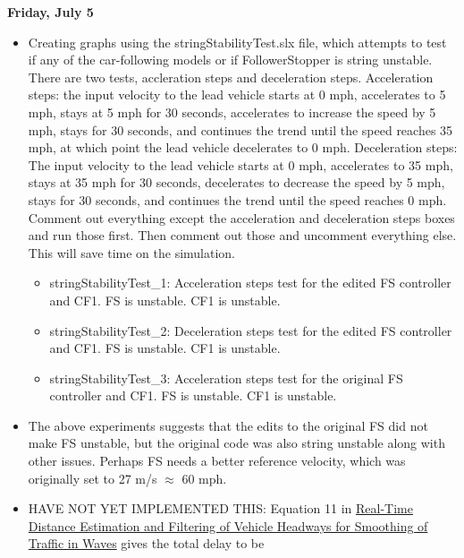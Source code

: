 \documentclass[12pt, letterpaper]{article}
\begin{document}
{\bf Friday, July 5} \\
\begin{itemize}
\item Creating graphs using the stringStabilityTest.slx file, which attempts to test if any of the car-following models or if FollowerStopper is string unstable. There are two tests, accleration steps and deceleration steps. Acceleration steps: the input velocity to the lead vehicle starts at 0 mph, accelerates to 5 mph, stays at 5 mph for 30 seconds, accelerates to increase the speed by 5 mph, stays for 30 seconds, and continues the trend until the speed reaches 35 mph, at which point the lead vehicle decelerates to 0 mph. Deceleration steps: The input velocity to the lead vehicle starts at 0 mph, accelerates to 35 mph, stays at 35 mph for 30 seconds, decelerates to decrease the speed by 5 mph, stays for 30 seconds, and continues the trend until the speed reaches 0 mph. Comment out everything except the acceleration and deceleration steps boxes and run those first. Then comment out those and uncomment everything else. This will save time on the simulation.
	\begin{itemize}
	\item stringStabilityTest\_1: Acceleration steps test for the edited FS controller and CF1. \linebreak
	FS is unstable. CF1 is unstable.
	\item stringStabilityTest\_2: Deceleration steps test for the edited FS controller and CF1. \linebreak
	FS is unstable. CF1 is unstable.
	\item stringStabilityTest\_3: Acceleration steps test for the original FS controller and CF1. \linebreak
	FS is unstable. CF1 is unstable.
	\end{itemize}
\item The above experiments suggests that the edits to the original FS did not make FS unstable, but the original code was also string unstable along with other issues. Perhaps FS needs a better reference velocity, which was originally set to 27 m/s $\approx$ 60 mph.
\item HAVE NOT YET IMPLEMENTED THIS: Equation 11 in  \href{https://www.researchgate.net/publication/332216360_Real-time_distance_estimation_and_filtering_of_vehicle_headways_for_smoothing_of_traffic_waves}{\color{blue} Real-Time Distance Estimation and Filtering of Vehicle Headways for Smoothing of Traffic in Waves} gives the total delay to be
\begin{eqnarray}

\end{eqnarray}
\end{itemize}
\end{document}
